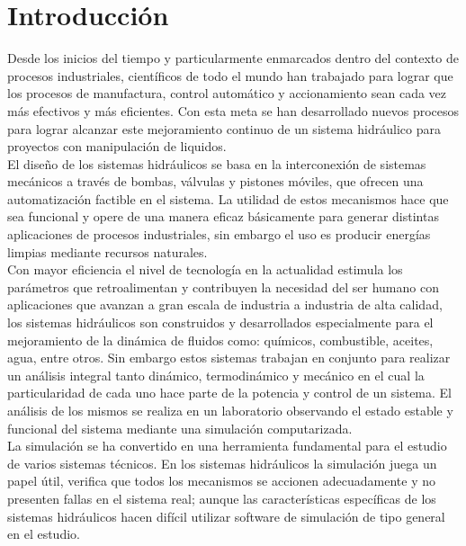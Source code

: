 \documentclass[a4paper,12pt,twoside]{proyectotanquesecci}
\begin{document}
\chapter{Introducción}

Desde los inicios del tiempo y particularmente enmarcados dentro del contexto de procesos industriales, científicos de todo el mundo han trabajado para lograr que los procesos de manufactura, control automático y accionamiento sean cada vez más efectivos y más eficientes. Con esta meta se han desarrollado nuevos procesos para lograr alcanzar este mejoramiento continuo de un sistema hidráulico para proyectos con manipulación de liquidos.\\

El diseño de los sistemas hidráulicos se basa en la interconexión de  sistemas mecánicos a través de bombas, válvulas y pistones móviles, que ofrecen una automatización factible  en el sistema. La utilidad de estos mecanismos hace que sea  funcional y  opere de una manera  eficaz básicamente para generar distintas aplicaciones de procesos industriales, sin embargo el uso es producir energías limpias mediante recursos naturales.\\

Con mayor eficiencia el nivel de tecnología en la actualidad estimula los parámetros que retroalimentan y contribuyen la necesidad del ser humano con aplicaciones que avanzan a gran escala de industria a industria de alta calidad,  los sistemas hidráulicos son construidos y desarrollados especialmente para el mejoramiento de la dinámica de fluidos como: químicos, combustible, aceites, agua, entre otros. Sin embargo estos sistemas trabajan en conjunto para realizar un análisis integral tanto dinámico, termodinámico y mecánico en el cual la particularidad de cada uno hace parte de la potencia y control de un sistema. El análisis de los mismos se realiza en un laboratorio observando el estado estable y funcional del sistema mediante una simulación computarizada.\\

La simulación se ha convertido en una herramienta fundamental para el estudio de varios sistemas técnicos. En los sistemas hidráulicos la simulación juega un papel útil, verifica que todos los mecanismos se accionen adecuadamente y no presenten fallas en el sistema real; aunque las características específicas de los sistemas hidráulicos hacen difícil utilizar software de simulación de tipo general en el estudio.\\
\end{document}

